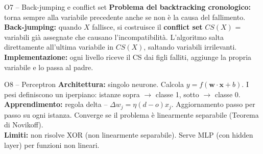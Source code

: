 \documentclass[12pt,a4paper]{article}
\begin{document}
\begin{risposta}{O7 -- Back-jumping e conflict set}
\textbf{Problema del backtracking cronologico:} torna sempre alla variabile precedente anche se non è la causa del fallimento. \\
\textbf{Back-jumping:} quando $X$ fallisce, si costruisce il \textbf{conflict set} $CS(X)$ = variabili già assegnate che causano l'incompatibilità. L'algoritmo salta direttamente all'ultima variabile in $CS(X)$, saltando variabili irrilevanti. \\
\textbf{Implementazione:} ogni livello riceve il CS dai figli falliti, aggiunge la propria variabile e lo passa al padre.
\end{risposta}

\begin{risposta}{O8 -- Perceptron}
\textbf{Architettura:} singolo neurone. Calcola $y = f(\mathbf{w}\cdot\mathbf{x} + b)$. I pesi definiscono un iperpiano: istanze sopra $\to$ classe 1, sotto $\to$ classe 0. \\
\textbf{Apprendimento:} regola delta -- $\Delta w_j = \eta(d-o)x_j$. Aggiornamento passo per passo su ogni istanza. Converge se il problema è linearmente separabile (Teorema di Novikoff). \\
\textbf{Limiti:} non risolve XOR (non linearmente separabile). Serve MLP (con hidden layer) per funzioni non lineari.
\end{risposta}
\end{document}
